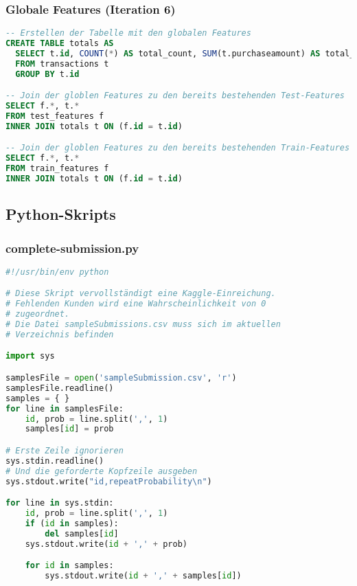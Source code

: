 \subsubsection{Globale Features (Iteration 6)}
\label{code:totals}
\begin{lstlisting}[language=SQL]
-- Erstellen der Tabelle mit den globalen Features
CREATE TABLE totals AS
  SELECT t.id, COUNT(*) AS total_count, SUM(t.purchaseamount) AS total_spent
  FROM transactions t
  GROUP BY t.id

-- Join der globlen Features zu den bereits bestehenden Test-Features
SELECT f.*, t.*
FROM test_features f
INNER JOIN totals t ON (f.id = t.id)

-- Join der globlen Features zu den bereits bestehenden Train-Features
SELECT f.*, t.*
FROM train_features f
INNER JOIN totals t ON (f.id = t.id)
\end{lstlisting}

\subsection{Python-Skripts}
\subsubsection{complete-submission.py}
\label{code:complete-submission}
\begin{lstlisting}[language=Python]
#!/usr/bin/env python

# Diese Skript vervollständigt eine Kaggle-Einreichung.
# Fehlenden Kunden wird eine Wahrscheinlichkeit von 0 
# zugeordnet.
# Die Datei sampleSubmissions.csv muss sich im aktuellen 
# Verzeichnis befinden

import sys

samplesFile = open('sampleSubmission.csv', 'r')
samplesFile.readline()
samples = { }
for line in samplesFile:
	id, prob = line.split(',', 1)
	samples[id] = prob

# Erste Zeile ignorieren
sys.stdin.readline()
# Und die geforderte Kopfzeile ausgeben
sys.stdout.write("id,repeatProbability\n")

for line in sys.stdin:
	id, prob = line.split(',', 1)
	if (id in samples):
		del samples[id]
	sys.stdout.write(id + ',' + prob)

	for id in samples:
		sys.stdout.write(id + ',' + samples[id])
\end{lstlisting}

